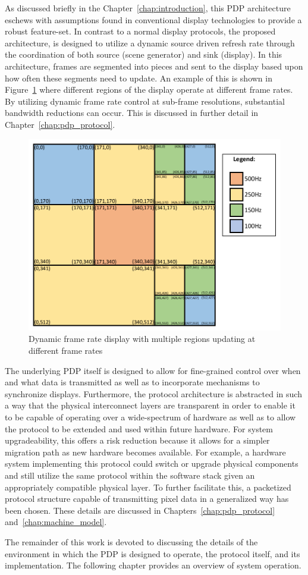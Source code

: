     As discussed briefly in the Chapter~\ref{chap:introduction}, this PDP architecture eschews with assumptions found in conventional display technologies to provide a robust feature-set. In contrast to a normal display protocols, the proposed architecture, is designed to utilize a dynamic source driven refresh rate through the coordination of both source (scene generator) and sink (display). In this architecture, frames are segmented into pieces and sent to the display based upon how often these segments need to update. An example of this is shown in Figure~\ref{fig:variable_display} where different regions of the display operate at different frame rates. By utilizing dynamic frame rate control at sub-frame resolutions, substantial bandwidth reductions can occur. This is discussed in further detail in Chapter~\ref{chap:pdp_protocol}.

    \begin{figure}
        \centering
        \includegraphics[width=1.0\textwidth]{fig/variable_display.pdf}
        \caption{Dynamic frame rate display with multiple regions updating at different frame rates}
        \label{fig:variable_display}
    \end{figure}

    The underlying PDP itself is designed to allow for fine-grained control over when and what data is transmitted as well as to incorporate mechanisms to synchronize displays. Furthermore, the protocol architecture is abstracted in such a way that the physical interconnect layers are transparent in order to enable it to be capable of operating over a wide-spectrum of hardware as well as to allow the protocol to be extended and used within future hardware. For system upgradeability, this offers a risk reduction because it allows for a simpler migration path as new hardware becomes available. For example, a hardware system implementing this protocol could switch or upgrade physical components and still utilize the same protocol within the software stack given an appropriately compatible physical layer. To further facilitate this, a packetized protocol structure capable of transmitting pixel data in a generalized way has been chosen. These details are discussed in Chapters~\ref{chap:pdp_protocol} and~\ref{chap:machine_model}.

    The remainder of this work is devoted to discussing the details of the environment in which the PDP is designed to operate, the protocol itself, and its implementation. The following chapter provides an overview of system operation.
